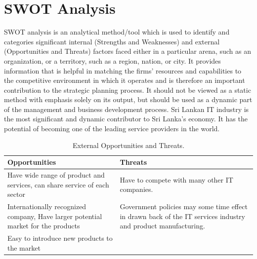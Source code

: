 \documentclass[twoside,12pt,times,onecolumn,a4paper]{report}
\begin{document}
\chapter{ SWOT Analysis }
\hspace{3em}SWOT analysis is an analytical method/tool which is used to identify and categories significant internal (Strengths and Weaknesses) and external (Opportunities and Threats) factors faced either in a particular arena, such as an organization, or a territory, such as a region, nation, or city.
It provides information that is helpful in matching the firms’ resources and capabilities to the competitive environment in which it operates and is therefore an important contribution to the strategic planning process. It should not be viewed as a static method with emphasis solely on its output, but should be used as a dynamic part of the management and business development process. Sri Lankan IT industry is the most significant and dynamic contributor to Sri Lanka’s economy. It has the potential of becoming one of the leading service providers in the world. 


\begin{table}[!h]
\centering


 \begin{tabular}{||p{}|p{}||}
 \hline
 Opportunities & Threats\\ [0.5ex] 
 \hline\hline
 Have wide range of product and services, can share service of each sector & Have to compete with many other IT companies. \\ 
 \hline
Internationally recognized company, Have larger potential market for the products& Government policies may some time effect in drawn back of the IT services industry and product manufacturing.  \\
 \hline
Easy to introduce new products to the market  &   \\ [1ex]
\hline
 \end{tabular}
\caption{External Opportunities and Threats.}
\label{tab:table1}
\end{table}
\end{document}
